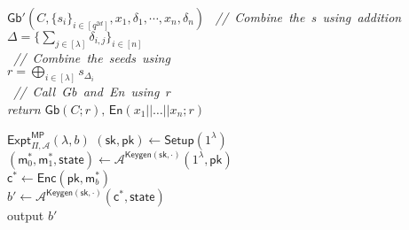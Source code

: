 \documentclass{article}
\newcommand{\comment}[1]{\sl\small\color{black!50} \mbox{ // #1 }}
\begin{document}
\begin{codebox}{$\mathsf{Gb}'(C, \{s_i\}_{i \in [q^{2d}]}, x_1, \delta_1, \cdots, x_n, \delta_n)$}
    \comment{Combine the \delta{}s using addition}\\
    $\Delta = \{ \sum_{j \in [\lambda]}  \delta_{i,j} \}_{i \in [n]}$\\
    \comment{Combine the seeds using \Delta}\\
    $r = \bigoplus_{i \in [\lambda]} s_{\Delta_i}$\\
    \comment{Call \textsf{Gb} and \textsf{En} using $r$}\\
    return $\textsf{Gb}(C; r),\, \textsf{En}(x_1 || \dots || x_n; r)$
\end{codebox}

\vspace{2em}

\newcommand{\secparam}{\ensuremath{\lambda}\xspace}

\newcommand{\FE}{\ensuremath{\mathsf{FE}}\xspace}
\newcommand{\Setup}{\ensuremath{\mathsf{Setup}}\xspace}
\newcommand{\Keygen}{\ensuremath{\mathsf{Keygen}}\xspace}
\newcommand{\Enc}{\ensuremath{\mathsf{Enc}}\xspace}
\newcommand{\Dec}{\ensuremath{\mathsf{Dec}}\xspace}

\newcommand{\sk}{\ensuremath{\mathsf{sk}}\xspace}
\newcommand{\pk}{\ensuremath{\mathsf{pk}}\xspace}
\newcommand{\ct}{\ensuremath{\mathsf{ct}}\xspace}
\newcommand{\cc}{\ensuremath{\mathsf{c}}\xspace}
\newcommand{\ek}{\ensuremath{\mathsf{ek}}\xspace}
\newcommand{\mm}{\ensuremath{\mathsf{m}}\xspace}
\newcommand{\state}{\ensuremath{\mathsf{state}}\xspace}

\newcommand{\FFF}{\ensuremath{\mathcal{F}}\xspace}
\newcommand{\MMM}{\ensuremath{\mathcal{M}}\xspace}
\newcommand{\AAA}{\ensuremath{\mathcal{A}}\xspace}

\newcommand{\Z}{\ensuremath{\mathbb{Z}}\xspace}
\newcommand{\N}{\ensuremath{\mathbb{N}}\xspace}
\newcommand{\Zp}{\ensuremath{\mathbb{Z}_p}\xspace}
\newcommand{\bool}{\ensuremath{\{0,1\}}\xspace}

\newcommand{\pat}{\ensuremath{\mathsf{pat}}\xspace}
\newcommand{\interpolate}{\ensuremath{\mathsf{Interpolate}}\xspace}
\newcommand{\pair}{\ensuremath{\mathsf{pair}}\xspace}

\newcommand\defeq{\stackrel{\mathclap{\normalfont\mbox{\scriptsize def}}}{=}}

\newcommand{\Adv}[1]{\ensuremath{\mathsf{Adv}^{\mathsf{#1}}_{\Pi, \AAA}(\secparam)}\xspace}
\newcommand{\Expt}[2]{\ensuremath{\mathsf{Expt}_{\Pi, \AAA}^{\mathsf{#1}}(\secparam, #2)}\xspace}
\begin{codebox}{$\Expt{MP}{b}$}
    $(\sk, \pk) \gets \Setup(1^\secparam)$\\
    $(\mm_0^*, \mm_1^*, \state) \gets \AAA^{\Keygen(\sk, \cdot)}(1^\secparam, \pk)$\\
    $\cc^* \gets \Enc(\pk, \mm_b^*)$\\
    $b' \gets \AAA^{\Keygen(\sk, \cdot)}(\cc^*, \state)$\\
    \textsf{output} $b'$
\end{codebox}
\end{document}
